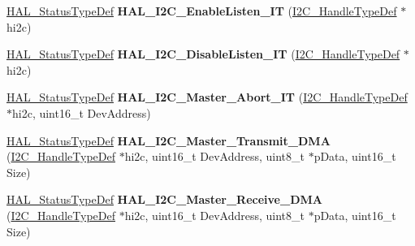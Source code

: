 \begin{DoxyCompactItemize}
\item 
\mbox{\label{group___i2_c___exported___functions___group2_gad8c3b67e4430bc8def0c885af769f3ab}} 
\mbox{\hyperlink{stm32f7xx__hal__def_8h_a63c0679d1cb8b8c684fbb0632743478f}{H\+A\+L\+\_\+\+Status\+Type\+Def}} {\bfseries H\+A\+L\+\_\+\+I2\+C\+\_\+\+Enable\+Listen\+\_\+\+IT} (\mbox{\hyperlink{struct_____i2_c___handle_type_def}{I2\+C\+\_\+\+Handle\+Type\+Def}} $\ast$hi2c)
\item 
\mbox{\label{group___i2_c___exported___functions___group2_gafd49a2b08bc6e30989c420a9c679b65e}} 
\mbox{\hyperlink{stm32f7xx__hal__def_8h_a63c0679d1cb8b8c684fbb0632743478f}{H\+A\+L\+\_\+\+Status\+Type\+Def}} {\bfseries H\+A\+L\+\_\+\+I2\+C\+\_\+\+Disable\+Listen\+\_\+\+IT} (\mbox{\hyperlink{struct_____i2_c___handle_type_def}{I2\+C\+\_\+\+Handle\+Type\+Def}} $\ast$hi2c)
\item 
\mbox{\label{group___i2_c___exported___functions___group2_gad001e42b424fc0d85a8e94380b9c7513}} 
\mbox{\hyperlink{stm32f7xx__hal__def_8h_a63c0679d1cb8b8c684fbb0632743478f}{H\+A\+L\+\_\+\+Status\+Type\+Def}} {\bfseries H\+A\+L\+\_\+\+I2\+C\+\_\+\+Master\+\_\+\+Abort\+\_\+\+IT} (\mbox{\hyperlink{struct_____i2_c___handle_type_def}{I2\+C\+\_\+\+Handle\+Type\+Def}} $\ast$hi2c, uint16\+\_\+t Dev\+Address)
\item 
\mbox{\label{group___i2_c___exported___functions___group2_ga978126d41a3a67384f4cb2fe3e6e7e8f}} 
\mbox{\hyperlink{stm32f7xx__hal__def_8h_a63c0679d1cb8b8c684fbb0632743478f}{H\+A\+L\+\_\+\+Status\+Type\+Def}} {\bfseries H\+A\+L\+\_\+\+I2\+C\+\_\+\+Master\+\_\+\+Transmit\+\_\+\+D\+MA} (\mbox{\hyperlink{struct_____i2_c___handle_type_def}{I2\+C\+\_\+\+Handle\+Type\+Def}} $\ast$hi2c, uint16\+\_\+t Dev\+Address, uint8\+\_\+t $\ast$p\+Data, uint16\+\_\+t Size)
\item 
\mbox{\label{group___i2_c___exported___functions___group2_ga299f5e16a92826b9856c60265bc22cf2}} 
\mbox{\hyperlink{stm32f7xx__hal__def_8h_a63c0679d1cb8b8c684fbb0632743478f}{H\+A\+L\+\_\+\+Status\+Type\+Def}} {\bfseries H\+A\+L\+\_\+\+I2\+C\+\_\+\+Master\+\_\+\+Receive\+\_\+\+D\+MA} (\mbox{\hyperlink{struct_____i2_c___handle_type_def}{I2\+C\+\_\+\+Handle\+Type\+Def}} $\ast$hi2c, uint16\+\_\+t Dev\+Address, uint8\+\_\+t $\ast$p\+Data, uint16\+\_\+t Size)

\end{DoxyCompactItemize}
